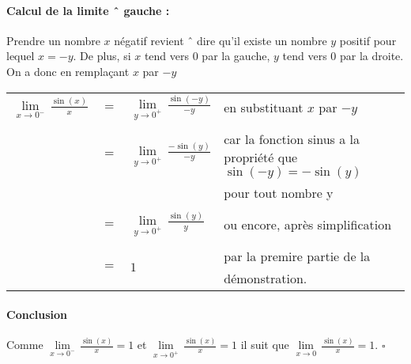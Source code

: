 \documentclass[10pt]{article}
\begin{document}
\newpage

\paragraph{Calcul de la limite ˆ gauche : } Prendre un nombre $x$ n\'egatif revient ˆ dire qu'il existe un nombre $y$ positif pour lequel $x=-y$. De plus, si $x$ tend vers $0$ par la gauche, $y$ tend vers $0$ par la droite. On a donc en rempla\c{c}ant $x$ par $-y$\\

\begin{tabular}{llll}
    $\displaystyle\underset{x\rightarrow 0^-}{\lim}\,\frac{\sin(x)}{x}$ & $=$ & $\displaystyle\underset{y\rightarrow 0^+}{\lim}\,\frac{\sin(-y)}{-y}$ & en substituant $x$ par $-y$                                      \\
                                                                        &     &                                                                                                                                          \\
                                                                        & $=$ & $\displaystyle\underset{y\rightarrow 0^+}{\lim}\,\frac{-\sin(y)}{-y}$ & car la fonction sinus a la propri\'et\'e que $\sin(-y)=-\sin(y)$ \\
                                                                        &     &                                                                       & pour tout nombre y                                               \\
                                                                        &     &                                                                                                                                          \\
                                                                        & $=$ & $\displaystyle\underset{y\rightarrow 0^+}{\lim}\,\frac{\sin(y)}{y}$   & ou encore, apr\`es simplification                                \\
                                                                        &     &                                                                                                                                          \\
                                                                        & $=$ & $1$                                                                   & par la premire partie de la d\'emonstration.
\end{tabular}

\paragraph{Conclusion} Comme $\displaystyle\underset{x\rightarrow 0^-}{\lim}\,\frac{\sin(x)}{x}=1$ et
$\displaystyle\underset{x\rightarrow 0^+}{\lim}\,\frac{\sin(x)}{x}=1$ il suit que $\displaystyle\underset{x\rightarrow 0}{\lim}\,\frac{\sin(x)}{x}=1$.
$\square$
\end{document}
